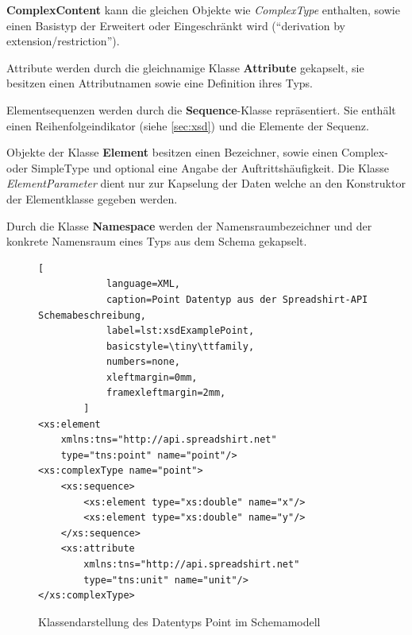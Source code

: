 \textbf{ComplexContent} kann die gleichen Objekte wie \emph{ComplexType} enthalten, sowie einen Basistyp der Erweitert oder Eingeschränkt wird (\enquote{derivation by extension/restriction}).

Attribute werden durch die gleichnamige Klasse \textbf{Attribute} gekapselt, sie besitzen einen Attributnamen sowie eine Definition ihres Typs.

Elementsequenzen werden durch die \textbf{Sequence}-Klasse repräsentiert. Sie enthält einen Reihenfolgeindikator (siehe \cref{sec:xsd}) und die Elemente der Sequenz.

Objekte der Klasse \textbf{Element} besitzen einen Bezeichner, sowie einen Complex- oder SimpleType und optional eine Angabe der Auftrittshäufigkeit. Die Klasse \emph{ElementParameter} dient nur zur Kapselung der Daten welche an den Konstruktor der Elementklasse gegeben werden.

Durch die Klasse \textbf{Namespace} werden der Namensraumbezeichner und der konkrete Namensraum eines Typs aus dem Schema gekapselt. 


\begin{figure}[ht]
    \centering
    \begin{minipage}[b]{0.50\linewidth}
        \begin{lstlisting}[
            language=XML,
            caption=Point Datentyp aus der Spreadshirt-API Schemabeschreibung,
            label=lst:xsdExamplePoint,    
            basicstyle=\tiny\ttfamily,
            numbers=none,
            xleftmargin=0mm,
            framexleftmargin=2mm,
        ]
<xs:element 
    xmlns:tns="http://api.spreadshirt.net" 
    type="tns:point" name="point"/>
<xs:complexType name="point">
    <xs:sequence>
        <xs:element type="xs:double" name="x"/>
        <xs:element type="xs:double" name="y"/>
    </xs:sequence>
    <xs:attribute 
        xmlns:tns="http://api.spreadshirt.net" 
        type="tns:unit" name="unit"/>
</xs:complexType>
        \end{lstlisting}
    \end{minipage}
    \quad    
    \begin{minipage}[b]{0.45\linewidth}
        \caption{Klassendarstellung des Datentyps Point im Schemamodell}
    \end{minipage}
\end{figure}